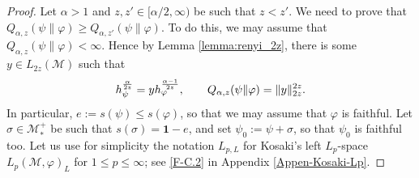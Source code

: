 \documentclass[12pt]{article}
\theoremstyle{definition}
\theoremstyle{remark}
\numberwithin{equation}{section}
\def\Me{\mathcal M}
\def\ffi{\varphi}
\def\1{\mathbf{1}}
\begin{document}
\begin{proof}
Let $\alpha>1$ and $z,z'\in[\alpha/2,\infty)$ be such that $z<z'$. We need to prove that
$Q_{\alpha,z}(\psi\|\ffi)\ge Q_{\alpha,z'}(\psi\|\ffi)$. To do this, we may assume that
$Q_{\alpha,z}(\psi\|\ffi)<\infty$. Hence by Lemma \ref{lemma:renyi_2z}, there is some $y\in L_{2z}(\Me)$
such that
\[
h_\psi^{\alpha\over2z}=yh_\ffi^{\alpha-1\over2z},\qquad
Q_{\alpha,z}(\psi\|\ffi)=\|y\|_{2z}^{2z}.
\]
In particular, $e:=s(\psi)\le s(\ffi)$, so that we may assume that $\ffi$ is faithful. Let $\sigma\in\Me_*^+$
be such that $s(\sigma)=\1-e$, and set $\psi_0:=\psi+\sigma$, so that $\psi_0$ is faithful too. Let us use
for simplicity the notation $L_{p,L}$ for Kosaki's left $L_p$-space $L_p(\Me,\ffi)_L$ for $1\le p\le\infty$;
see \eqref{F-C.2} in Appendix \ref{Appen-Kosaki-Lp}.


\end{proof}
\end{document}
